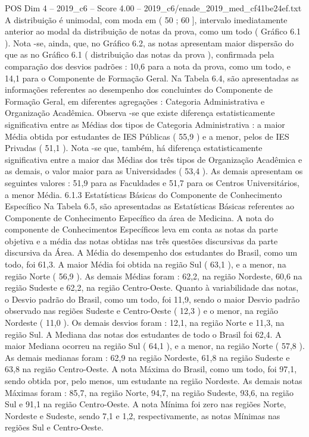 \begin{textsample}{POS Dim 4 – 2019\_c6 – Score 4.00 – 2019\_c6/enade\_2019\_med\_cf41be24ef.txt}
A distribuição é unimodal, com moda em ( 50 ; 60 ], intervalo imediatamente anterior ao modal da distribuição de notas da prova, como um todo ( Gráfico 6.1 ).
Nota -se, ainda, que, no Gráfico 6.2, as notas apresentam maior dispersão do que as no Gráfico 6.1 ( distribuição das notas da prova ), confirmada pela comparação dos desvios padrões : 10,6 para a nota da prova, como um todo, e 14,1 para o Componente de Formação Geral.
Na Tabela 6.4, são apresentadas as informações referentes ao desempenho dos concluintes do Componente de Formação Geral, em diferentes agregações : Categoria Administrativa e Organização Acadêmica.
Observa -se que existe diferença estatisticamente significativa entre as Médias dos tipos de Categoria Administrativa : a maior Média obtida por estudantes de IES Públicas ( 55,9 ) e a menor, pelos de IES Privadas ( 51,1 ).
Nota -se que, também, há diferença estatisticamente significativa entre a maior das Médias dos três tipos de Organização Acadêmica e as demais, o valor maior para as Universidades ( 53,4 ).
As demais apresentam os seguintes valores : 51,9 para as Faculdades e 51,7 para os Centros Universitários, a menor Média. 6.1.3 Estatísticas Básicas do Componente de Conhecimento Específico Na Tabela 6.5, são apresentadas as Estatísticas Básicas referentes ao Componente de Conhecimento Específico da área de Medicina.
A nota do componente de Conhecimentos Específicos leva em conta as notas da parte objetiva e a média das notas obtidas nas três questões discursivas da parte discursiva da Área.
A Média do desempenho dos estudantes do Brasil, como um todo, foi 61,3.
A maior Média foi obtida na região Sul ( 63,1 ), e a menor, na região Norte ( 56,9 ).
As demais Médias foram : 62,2, na região Nordeste, 60,6 na região Sudeste e 62,2, na região Centro-Oeste.
Quanto à variabilidade das notas, o Desvio padrão do Brasil, como um todo, foi 11,9, sendo o maior Desvio padrão observado nas regiões Sudeste e Centro-Oeste ( 12,3 ) e o menor, na região Nordeste ( 11,0 ).
Os demais desvios foram : 12,1, na região Norte e 11,3, na região Sul.
A Mediana das notas dos estudantes de todo o Brasil foi 62,4.
A maior Mediana ocorreu na região Sul ( 64,1 ), e a menor, na região Norte ( 57,8 ).
As demais medianas foram : 62,9 na região Nordeste, 61,8 na região Sudeste e 63,8 na região Centro-Oeste.
A nota Máxima do Brasil, como um todo, foi 97,1, sendo obtida por, pelo menos, um estudante na região Nordeste.
As demais notas Máximas foram : 85,7, na região Norte, 94,7, na região Sudeste, 93,6, na região Sul e 91,1 na região Centro-Oeste.
A nota Mínima foi zero nas regiões Norte, Nordeste e Sudeste, sendo 7,1 e 1,2, respectivamente, as notas Mínimas nas regiões Sul e Centro-Oeste.

\end{textsample}
